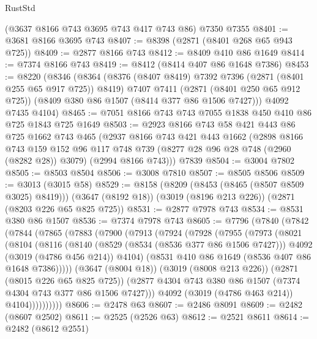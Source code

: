 \begin{lexlean}{RustStd}
\begin{coremodule}
    (@3637 @8166 @743 @3695 @743 @417 @743 @86)
    @7350
    @7355
@8401 := @3681 @8166 @3695 @743
@8407 := @8398 (@2871 (@8401 @268 @65 @943 @725))
@8409 := @2877 @8166 @743
@8412 := @8409 @410 @86 @1649
@8414 := @7374 @8166 @743
@8419 := @8412 (@8414 @407 @86 @1648 @7386)
@8453 := @8220
    (@8346
      (@8364
        (@8376 (@8407 @8419) @7392 @7396 (@2871 (@8401 @255 @65 @917 @725)) @8419)
        @7407
        @7411
        (@2871 (@8401 @250 @65 @912 @725))
        (@8409 @380 @86 @1507 (@8414 @377 @86 @1506 @7427)))
      @4092
      @7435
      @4104)
@8465 := @7051 @8166 @743 @743 @7055 @1838 @450 @410 @86 @725 @1843 @725 @1649
@8503 := @2923
    @8166
    @743
    @58
    @421
    @443
    @86
    @725
    @1662
    @743
    @465
    (@2937
      @8166
      @743
      @421
      @443
      @1662
      (@2898
        @8166
        @743
        @159
        @152
        @96
        @117
        @748
        @739
        (@8277 @28 @96 @28 @748 (@2960 (@8282 @28)) @3079)
        (@2994 @8166 @743)))
    @7839
@8504 := @3004 @7802
@8505 := @8503 @8504
@8506 := @3008 @7810
@8507 := @8505 @8506
@8509 := @3013 (@3015 @58)
@8529 := @8158
    (@8209 (@8453 (@8465 (@8507 @8509 @3025) @8419)))
    (@3647 (@8192 @18))
    (@3019 (@8196 @213 @226))
    (@2871 (@8203 @226 @65 @825 @725))
@8531 := @2877 @7978 @743
@8534 := @8531 @380 @86 @1507
@8536 := @7374 @7978 @743
@8605 := @7796
    (@7840
      (@7842
        (@7844
          (@7865
            (@7883
              (@7900
                (@7913
                  (@7924
                    (@7928
                      (@7955
                        (@7973
                          (@8021
                            (@8104
                              (@8116
                                (@8140
                                  (@8529 (@8534 (@8536 @377 @86 @1506 @7427)))
                                  @4092
                                  (@3019 (@4786 @456 @214))
                                  @4104)
                                (@8531 @410 @86 @1649 (@8536 @407 @86 @1648 @7386)))))
                          (@3647 (@8004 @18))
                          (@3019 (@8008 @213 @226))
                          (@2871 (@8015 @226 @65 @825 @725))
                          (@2877 @4304 @743 @380 @86 @1507 (@7374 @4304 @743 @377 @86 @1506 @7427)))
                        @4092
                        (@3019 (@4786 @463 @214))
                        @4104))))))))))
@8606 := @2478 @63
@8607 := @2486 @8091
@8609 := @2482 (@8607 @2502)
@8611 := @2525 (@2526 @63)
@8612 := @2521 @8611
@8614 := @2482 (@8612 @2551)

\end{coremodule}
\end{lexlean}

